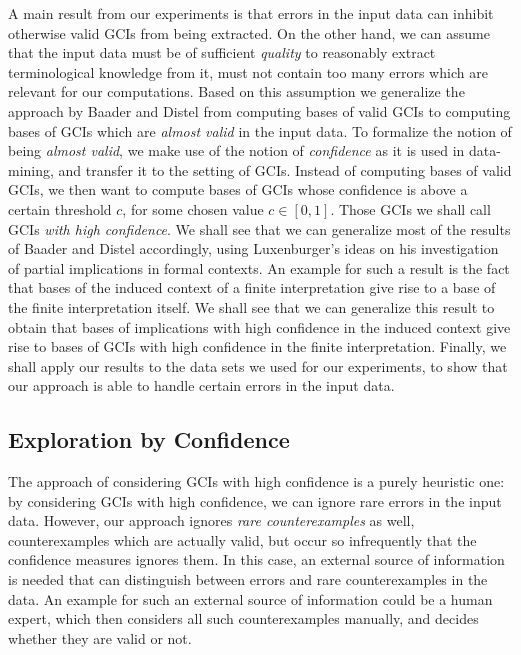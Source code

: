 A main result from our experiments is that errors in the input data can inhibit otherwise
valid GCIs from being extracted.  On the other hand, we can assume that the input data
must be of sufficient \emph{quality} to reasonably extract terminological knowledge from
it, \ie must not contain too many errors which are relevant for our computations.  Based
on this assumption we generalize the approach by Baader and Distel from computing bases of
valid GCIs to computing bases of GCIs which are \emph{almost valid} in the input data.  To
formalize the notion of being \emph{almost valid}, we make use of the notion of
\emph{confidence} as it is used in data-mining, and transfer it to the setting of GCIs.
Instead of computing bases of valid GCIs, we then want to compute bases of GCIs whose
confidence is above a certain threshold $c$, for some chosen value $c \in [0,1]$.  Those
GCIs we shall call GCIs \emph{with high confidence}.  We shall see that we can generalize
most of the results of Baader and Distel accordingly, using Luxenburger's ideas on his
investigation of partial implications in formal contexts.  An example for such a result is
the fact that bases of the induced context of a finite interpretation give rise to a base
of the finite interpretation itself.  We shall see that we can generalize this result to
obtain that bases of implications with high confidence in the induced context give rise to
bases of GCIs with high confidence in the finite interpretation.  Finally, we shall apply
our results to the data sets we used for our experiments, to show that our approach is
able to handle certain errors in the input data.

\subsection{Exploration by Confidence}
\label{sec:expl-conf-2}

The approach of considering GCIs with high confidence is a purely heuristic one: by
considering GCIs with high confidence, we can ignore rare errors in the input data.
However, our approach ignores \emph{rare counterexamples} as well, \ie counterexamples
which are actually valid, but occur so infrequently that the confidence measures ignores
them.  In this case, an external source of information is needed that can distinguish
between errors and rare counterexamples in the data.  An example for such an external
source of information could be a human expert, which then considers all such
counterexamples manually, and decides whether they are valid or not.

